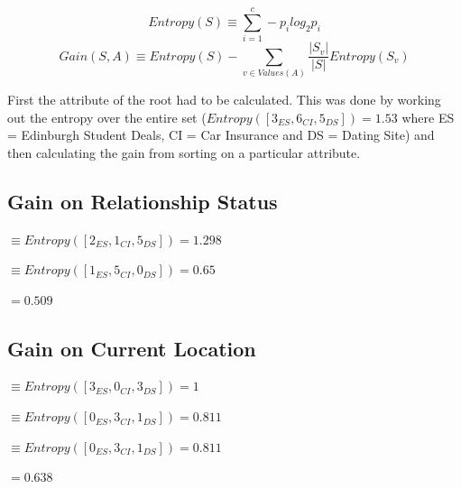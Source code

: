 \documentclass[8pt]{article}
\begin{document}
    \begin{equation}
      Entropy(S)\equiv \sum_{i=1}^{c} -p_{i}log_{2}p_{i}
    \end{equation}
    \begin{equation}
      Gain(S,A)\equiv Entropy(S) - \sum_{v\in Values(A)} \frac{|S_v|}{|S|}Entropy(S_v)
    \end{equation}

    First the attribute of the root had to be calculated. This was done by working out the entropy over the
    entire set ($Entropy([3_{ES},6_{CI},5_{DS}]) = 1.53$ where ES = Edinburgh Student Deals, CI = Car Insurance and
    DS = Dating Site) and then calculating the gain from sorting on a particular attribute.

    \subsection{Gain on Relationship Status}

      \begin{description}
        \setlength{\itemsep}{1pt}
        \setlength{\parskip}{0pt}
        \setlength{\parsep}{0pt}
        \item[$Entropy(S_{Single})$] $\equiv Entropy([2_{ES},1_{CI},5_{DS}]) = 1.298$
        \item[$Entropy(S_{Relationship})$] $\equiv Entropy([1_{ES},5_{CI},0_{DS}]) = 0.65$
        \item[$Gain(S,RS)$] $= 0.509$ 
      \end{description} 

    \subsection{Gain on Current Location}

      \begin{description}
        \setlength{\itemsep}{1pt}
        \setlength{\parskip}{0pt}
        \setlength{\parsep}{0pt}
        \item[$Entropy(S_{Edinburgh})$] $\equiv Entropy([3_{ES},0_{CI},3_{DS}]) = 1$
        \item[$Entropy(S_{Glasgow})$] $\equiv Entropy([0_{ES},3_{CI},1_{DS}]) = 0.811$
        \item[$Entropy(S_{London})$] $\equiv Entropy([0_{ES},3_{CI},1_{DS}]) = 0.811$
        \item[$Gain(S,CL)$] $= 0.638$
      \end{description}
\end{document}
